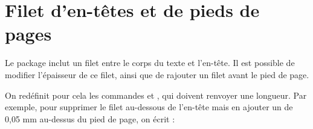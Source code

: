 \section{Filet d'en-têtes et de pieds de pages}

Le package  inclut un filet entre le corps du texte et l'en-tête. Il est possible de modifier l'épaisseur de ce filet, ainsi que de rajouter un filet avant le  pied de page.

On redéfinit pour cela les commandes  et , qui doivent renvoyer une longueur.
Par exemple, pour supprimer le filet au-dessous de l'en-tête mais en ajouter un de 0,05 mm au-dessus du pied de page, on écrit : 

\begin{latexcode}
\renewcommand{\headrulewidth}[0]{0pt}
\renewcommand{\footrulewidth}[0]{0.05mm}
\end{latexcode}
